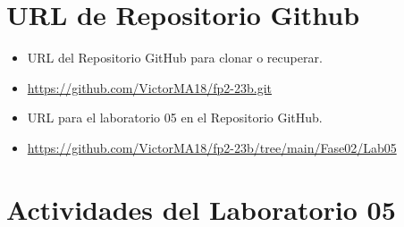 \documentclass{article}
\begin{document}
	\section{URL de Repositorio Github}
	\begin{itemize}
		\item URL del Repositorio GitHub para clonar o recuperar.
		\item \url{https://github.com/VictorMA18/fp2-23b.git}
		\item URL para el laboratorio 05 en el Repositorio GitHub.
		\item \url{https://github.com/VictorMA18/fp2-23b/tree/main/Fase02/Lab05}
	\end{itemize}
	
	\section{Actividades del Laboratorio 05}
	
\end{document}
